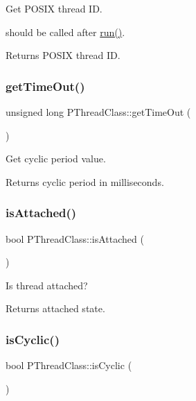 Get P\+O\+S\+IX thread ID.

should be called after \hyperlink{classPThreadClass_a9e60b014b8e8ba6892cc322b6ba183d8}{run()}. \begin{DoxyReturn}{Returns}
P\+O\+S\+IX thread ID. 
\end{DoxyReturn}
\mbox{\label{classPThreadClass_accc3e3d98e44796d9f78bc16e22c5403}} 
\subsubsection{\texorpdfstring{get\+Time\+Out()}{getTimeOut()}}
{\footnotesize\ttfamily unsigned long P\+Thread\+Class\+::get\+Time\+Out (\begin{DoxyParamCaption}{ }\end{DoxyParamCaption})\hspace{0.3cm}{\ttfamily [inline]}}

Get cyclic period value. \begin{DoxyReturn}{Returns}
cyclic period in milliseconds. 
\end{DoxyReturn}
\mbox{\label{classPThreadClass_af2ad966c36b6995587bde14965722ffc}} 
\subsubsection{\texorpdfstring{is\+Attached()}{isAttached()}}
{\footnotesize\ttfamily bool P\+Thread\+Class\+::is\+Attached (\begin{DoxyParamCaption}{ }\end{DoxyParamCaption})\hspace{0.3cm}{\ttfamily [inline]}}

Is thread attached? \begin{DoxyReturn}{Returns}
attached state. 
\end{DoxyReturn}
\mbox{\label{classPThreadClass_a707a99aa60413db5d6e42230f1f63632}} 
\subsubsection{\texorpdfstring{is\+Cyclic()}{isCyclic()}}
{\footnotesize\ttfamily bool P\+Thread\+Class\+::is\+Cyclic (\begin{DoxyParamCaption}{ }\end{DoxyParamCaption})\hspace{0.3cm}{\ttfamily [inline]}}

